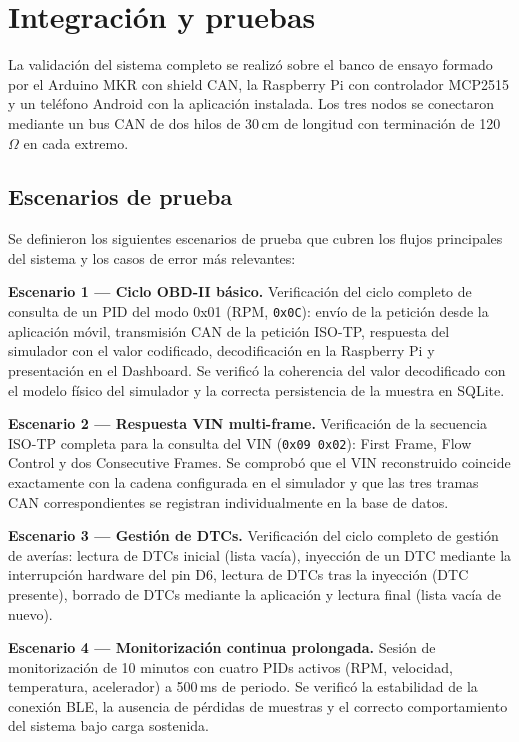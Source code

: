 \section{Integración y pruebas}
\label{sec:integracion}

La validación del sistema completo se realizó sobre el banco de ensayo formado por el Arduino MKR con shield CAN, la Raspberry Pi con controlador MCP2515 y un teléfono Android con la aplicación instalada. Los tres nodos se conectaron mediante un bus CAN de dos hilos de 30\,cm de longitud con terminación de 120\,$\Omega$ en cada extremo.


\subsection{Escenarios de prueba}

Se definieron los siguientes escenarios de prueba que cubren los flujos principales del sistema y los casos de error más relevantes:

\textbf{Escenario 1 — Ciclo OBD-II básico.} Verificación del ciclo completo de consulta de un PID del modo 0x01 (RPM, \texttt{0x0C}): envío de la petición desde la aplicación móvil, transmisión CAN de la petición ISO-TP, respuesta del simulador con el valor codificado, decodificación en la Raspberry Pi y presentación en el Dashboard. Se verificó la coherencia del valor decodificado con el modelo físico del simulador y la correcta persistencia de la muestra en SQLite.

\textbf{Escenario 2 — Respuesta VIN multi-frame.} Verificación de la secuencia ISO-TP completa para la consulta del VIN (\texttt{0x09 0x02}): First Frame, Flow Control y dos Consecutive Frames. Se comprobó que el VIN reconstruido coincide exactamente con la cadena configurada en el simulador y que las tres tramas CAN correspondientes se registran individualmente en la base de datos.

\textbf{Escenario 3 — Gestión de DTCs.} Verificación del ciclo completo de gestión de averías: lectura de DTCs inicial (lista vacía), inyección de un DTC mediante la interrupción hardware del pin D6, lectura de DTCs tras la inyección (DTC presente), borrado de DTCs mediante la aplicación y lectura final (lista vacía de nuevo).

\textbf{Escenario 4 — Monitorización continua prolongada.} Sesión de monitorización de 10 minutos con cuatro PIDs activos (RPM, velocidad, temperatura, acelerador) a 500\,ms de periodo. Se verificó la estabilidad de la conexión BLE, la ausencia de pérdidas de muestras y el correcto comportamiento del sistema bajo carga sostenida.

